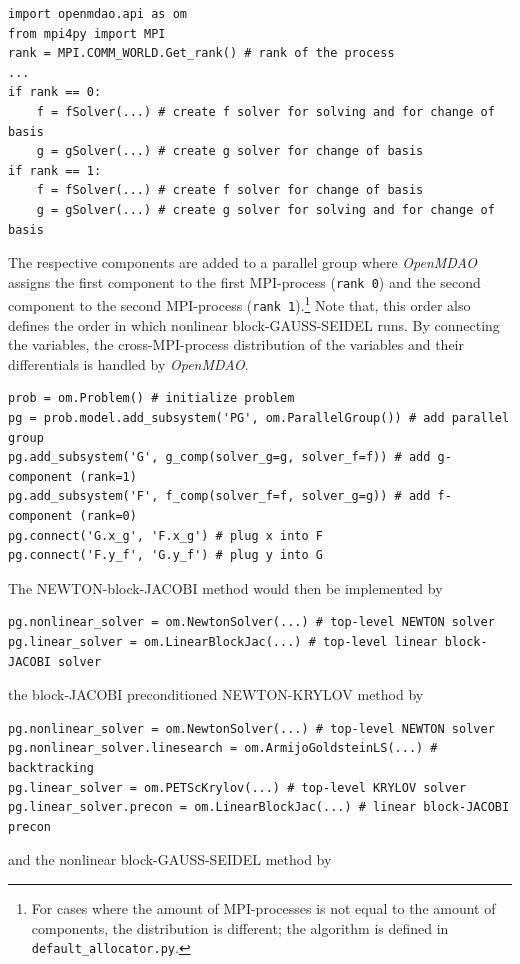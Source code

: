 \documentclass[10pt, ngerman, english,
twoside, open=right,
numbers=noenddot,
declaration=section,
abstract=section,
abstract=multiple,
abstract=notoc,
declaration=notoc,
cd=pale, 
chapterprefix=off, 
chapterpage=false, 
headingsvskip=-10em,
cdgeometry=custom, 
slantedgreek=on,
cdmath=on, 
cdfont=on,
ttfont=false,
mathswap=off,
]{tudscrreprt}
\numberwithin{equation}{chapter}
\renewcommand{\textsc}[1]{\uppercase{\mbox{#1}}}
\begin{document}
\begin{lstlisting}[firstnumber=1]
import openmdao.api as om
from mpi4py import MPI
rank = MPI.COMM_WORLD.Get_rank() # rank of the process
...
if rank == 0:
	f = fSolver(...) # create f solver for solving and for change of basis
	g = gSolver(...) # create g solver for change of basis
if rank == 1:
	f = fSolver(...) # create f solver for change of basis
	g = gSolver(...) # create g solver for solving and for change of basis
\end{lstlisting}
The respective components are added to a parallel group where \textit{OpenMDAO} assigns the first component to the first MPI-process (\texttt{rank 0}) and the second component to the second MPI-process (\texttt{rank 1}).\footnote{For cases where the amount of MPI-processes is not equal to the amount of components, the distribution is different; the algorithm is defined in \texttt{default\_allocator.py}.} Note that, this order also defines the order in which nonlinear block-\textsc{Gau\ss}-\textsc{Seidel} runs.
By connecting the variables, the cross-MPI-process distribution of the variables and their differentials is handled by \textit{OpenMDAO}. 
\begin{lstlisting}[firstnumber=11]
prob = om.Problem() # initialize problem
pg = prob.model.add_subsystem('PG', om.ParallelGroup()) # add parallel group
pg.add_subsystem('G', g_comp(solver_g=g, solver_f=f)) # add g-component (rank=1)
pg.add_subsystem('F', f_comp(solver_f=f, solver_g=g)) # add f-component (rank=0)
pg.connect('G.x_g', 'F.x_g') # plug x into F
pg.connect('F.y_f', 'G.y_f') # plug y into G
\end{lstlisting}
The \textsc{Newton}-block-\textsc{Jacobi} method would then be implemented by
\begin{lstlisting}[firstnumber=17]
pg.nonlinear_solver = om.NewtonSolver(...) # top-level NEWTON solver
pg.linear_solver = om.LinearBlockJac(...) # top-level linear block-JACOBI solver
\end{lstlisting}
the block-\textsc{Jacobi} preconditioned \textsc{Newton}-\textsc{Krylov} method by
\begin{lstlisting}[firstnumber=17]
pg.nonlinear_solver = om.NewtonSolver(...) # top-level NEWTON solver
pg.nonlinear_solver.linesearch = om.ArmijoGoldsteinLS(...) # backtracking
pg.linear_solver = om.PETScKrylov(...) # top-level KRYLOV solver
pg.linear_solver.precon = om.LinearBlockJac(...) # linear block-JACOBI precon
\end{lstlisting}
and the nonlinear block-\textsc{Gau\ss}-\textsc{Seidel} method by\newpage
\end{document}
